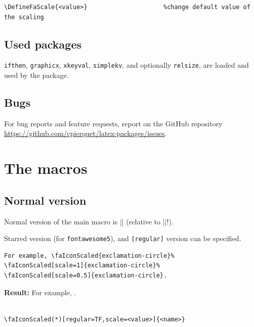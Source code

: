 \documentclass{article}
\begin{document}
\begin{Verbatim}[frame=single]
\DefineFaScale{<value>}                     %change default value of the scaling
\end{Verbatim}

\subsection{Used packages}

\texttt{ifthen}, \texttt{graphicx}, \texttt{xkeyval}, \texttt{simplekv}, and optionally \texttt{relsize}, are loaded and used by the package.

\subsection{Bugs}

For bug reports and feature requests, report on the GitHub repository \url{https://github.com/cpierquet/latex-packages/issues}.

\pagebreak

\section{The macros}

\subsection{Normal version}

Normal version of the main macro is |\faIconScaled| (relative to |\faIcon|!).

Starred version (for \texttt{fontawesome5}), and \texttt{[regular]} version can be specified.

\begin{Verbatim}[frame=single]
For example, \faIconScaled{exclamation-circle}%
\faIconScaled[scale=1]{exclamation-circle}%
\faIconScaled[scale=0.5]{exclamation-circle}.
\end{Verbatim}

\textbf{Result:} For example, .

\begin{Verbatim}[frame=single]
%patched version of \faIcon(*)[regular]{<name>}    %if * and regular are available!

\faIconScaled(*)[regular=TF,scale=<value>]{<name>}
\end{Verbatim}
\end{document}

